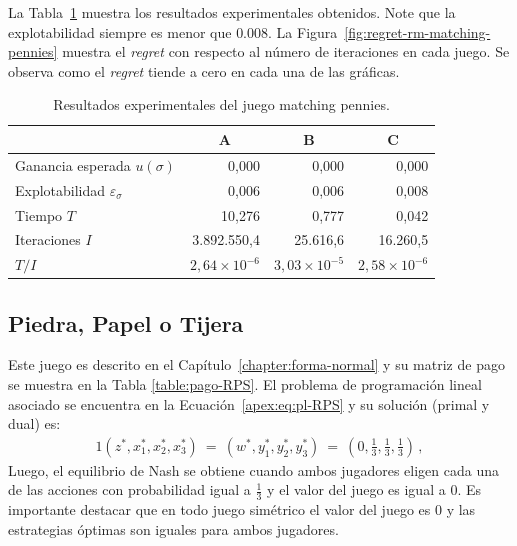 La Tabla~\ref{table:resultados-rm-matching-pennies} muestra los resultados experimentales obtenidos. Note que la explotabilidad siempre es menor que $0.008$. La Figura~\ref{fig:regret-rm-matching-pennies} muestra el \textit{regret} con respecto al número de iteraciones en cada juego. Se observa como el \textit{regret} tiende a cero en cada una de las gráficas.
 
\begin{table}[t]
\caption{Resultados experimentales del juego matching pennies.}
\label{table:resultados-rm-matching-pennies}
\centering
\begin{tabular}{l r r r}
    \toprule
    & \multicolumn{1}{c}{A} & \multicolumn{1}{c}{B} & \multicolumn{1}{c}{C} \\ \midrule
    Ganancia esperada $u(\sigma)$             &     0,000 &      0,000 &      0,000 \\
    Explotabilidad $\varepsilon_{\sigma}$     &         0,006 &      0,006 &      0,008 \\
    Tiempo $T$                                &        10,276 &      0,777 &      0,042 \\
    Iteraciones $I$                           & 3.892.550,4   & 25.616,6   & 16.260,5   \\
    $T/I$                                     & $2,64{\times}10^{-6}$ & $3,03{\times}10^{-5}$ & $2,58{\times}10^{-6}$ \\
    \bottomrule
\end{tabular}
\end{table}

\subsection*{Piedra, Papel o Tijera}

Este juego es descrito en el Capítulo~\ref{chapter:forma-normal} y su matriz de pago se muestra en la Tabla \ref{table:pago-RPS}. El problema de programación lineal asociado se encuentra en la Ecuación~\ref{apex:eq:pl-RPS} y su solución (primal y dual) es:
\begin{alignat}{1}
(z^*, x_1^*, x_2^*, x_3^*)\ =\ (w^*, y_1^*, y_2^*, y_3^*)\ =\  \left(0, \frac{1}{3}, \frac{1}{3}, \frac{1}{3}\right) \,,
\end{alignat}
Luego, el equilibrio de Nash se obtiene cuando ambos jugadores eligen cada una de las acciones con probabilidad igual a $\frac{1}{3}$ y el valor del juego es igual a $0$. Es importante destacar que en todo juego simétrico el valor del juego es $0$ y las estrategias óptimas son iguales para ambos jugadores.

